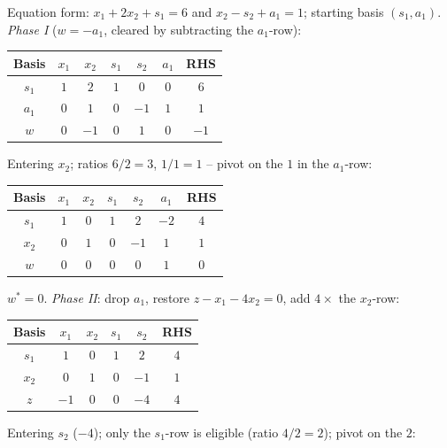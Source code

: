 \begin{solutions}
  \item Equation form: $x_{1}+2x_{2}+s_{1}=6$ and $x_{2}-s_{2}+a_{1}=1$;
        starting basis $(s_{1},a_{1})$. \emph{Phase I} ($w=-a_{1}$,
        cleared by subtracting the $a_{1}$-row):
        \begin{center}
        \begin{tabular}{c|ccccc|c}
        Basis & $x_{1}$ & $x_{2}$ & $s_{1}$ & $s_{2}$ & $a_{1}$ & RHS\\
        \hline
        $s_{1}$ & $1$ & $2$ & $1$ & $0$ & $0$ & $6$\\
        $a_{1}$ & $0$ & $1$ & $0$ & $-1$ & $1$ & $1$\\
        \hline
        $w$ & $0$ & $-1$ & $0$ & $1$ & $0$ & $-1$\\
        \end{tabular}
        \end{center}
        Entering $x_{2}$; ratios $6/2=3$, $1/1=1$ -- pivot on the $1$ in
        the $a_{1}$-row:
        \begin{center}
        \begin{tabular}{c|ccccc|c}
        Basis & $x_{1}$ & $x_{2}$ & $s_{1}$ & $s_{2}$ & $a_{1}$ & RHS\\
        \hline
        $s_{1}$ & $1$ & $0$ & $1$ & $2$ & $-2$ & $4$\\
        $x_{2}$ & $0$ & $1$ & $0$ & $-1$ & $1$ & $1$\\
        \hline
        $w$ & $0$ & $0$ & $0$ & $0$ & $1$ & $0$\\
        \end{tabular}
        \end{center}
        $w^{*}=0$. \emph{Phase II}: drop $a_{1}$, restore
        $z-x_{1}-4x_{2}=0$, add $4\times$ the $x_{2}$-row:
        \begin{center}
        \begin{tabular}{c|cccc|c}
        Basis & $x_{1}$ & $x_{2}$ & $s_{1}$ & $s_{2}$ & RHS\\
        \hline
        $s_{1}$ & $1$ & $0$ & $1$ & $2$ & $4$\\
        $x_{2}$ & $0$ & $1$ & $0$ & $-1$ & $1$\\
        \hline
        $z$ & $-1$ & $0$ & $0$ & $-4$ & $4$\\
        \end{tabular}
        \end{center}
        Entering $s_{2}$ ($-4$); only the $s_{1}$-row is eligible
        (ratio $4/2=2$); pivot on the $2$:
        \begin{center}

\end{center}
\end{solutions}
